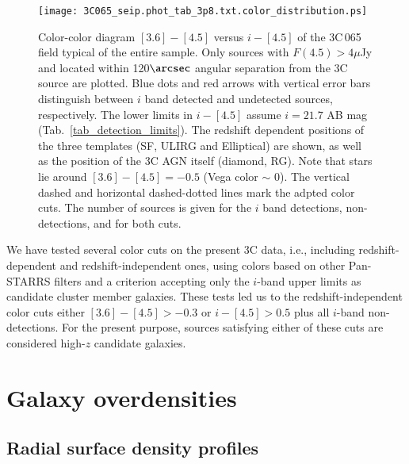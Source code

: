 \documentclass[mathleft,fleqn,%
]{an}
\begin{document}
\begin{figure}
  \texttt{[image: 3C065\_seip.phot\_tab\_3p8.txt.color\_distribution.ps]}
  \caption{Color-color diagram $[3.6] - [4.5]$ versus $i - [4.5]$
    of the 3C\,065 field typical of the entire sample.
    Only sources with  $F(4.5) > 4 \mu$Jy and located within 120$\arcsec$
    angular separation from the 3C source are plotted.
    Blue dots and  red arrows with vertical
    error bars distinguish between  $i$ band detected  and
    undetected sources, respectively.
    The lower limits in $i - [4.5]$ assume $i = 21.7$ AB mag
    (Tab.~\ref{tab_detection_limits}). 
    The redshift dependent positions of the three templates (SF, ULIRG
    and Elliptical) are shown, as well as the position of the 3C AGN
    itself (diamond, RG).
    Note that stars lie around $[3.6] - [4.5] = -0.5$ (Vega color
    $\sim$ 0).
    The vertical dashed and horizontal dashed-dotted lines mark the
    adpted color
    cuts.
    The number of sources is given for the $i$ band
    detections, non-detections, and for both cuts.
  }
  \label{fig_ccd}
\end{figure}

  
We have tested several color cuts on the present 3C data, i.e., 
including redshift-dependent and redshift-independent ones, using 
colors based on other Pan-STARRS
filters and 
a criterion accepting only the $i$-band upper limits as candidate cluster
member galaxies. 
These tests led us to the redshift-independent color cuts either 
$[3.6] - [4.5] > -0.3$  or
$i - [4.5] > 0.5$ plus all $i$-band
non-detections.
For the present purpose, sources satisfying either of these cuts are  
considered high-$z$ candidate galaxies.






\section{Galaxy overdensities} \label{sec:galaxy_overdensities}

\subsection{Radial surface density profiles}
\label{sec:density_profiles}
\end{document}
